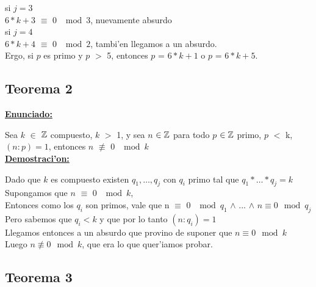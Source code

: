 si $j = 3$\\

$6*k + 3$ $\equiv$ 0  $\mod{3}$, nuevamente absurdo\\

si $j = 4$\\

$6*k + 4$ $\equiv$ 0  $\mod{2}$, tambi'en llegamos a un absurdo.\\

Ergo, si $p$ es primo y $p$ $>$ 5, entonces $p$ = $6*k+1$ o $p$ = $6*k +5$.

\subsection{Teorema 2}
\label{demo2}

\textbf{\underline{Enunciado:}\\}

Sea $k$ $\in$ ${\mathbb Z}$ compuesto, $k$ $>$ 1, y sea $n$ ${\in {\mathbb Z}}$ para todo $p$ ${\in {\mathbb Z}}$ primo, $p$ $<$ k, $(n:p) = 1$, entonces $n$ $\not\equiv$ 0 $\mod{k}$\\

\textbf{\underline{Demostraci'on:}\\}

Dado que $k$ es compuesto existen $q_1,\ldots,q_j$ con $q_i$ primo tal que $q_1*\ldots*q_j = k$ \\

Supongamos que $n$ $\equiv$ 0 $\mod{k}$,\\

Entonces como los $q_i$ son primos, vale que n $\equiv$ 0 $\mod{q_1}$ $\wedge$ ... $\wedge$ $n \equiv 0 \mod{q_j}$ \\

Pero sabemos que $q_i < k$ y que por lo tanto $(n:q_{i}) = 1$ \\

Llegamos entonces a un absurdo que provino de suponer que  $n \equiv 0 \mod{k}$ \\ 

Luego $n \not\equiv 0 \mod{k}$, que era lo que quer'iamos probar.


\subsection{Teorema 3}
\label{demo3}


